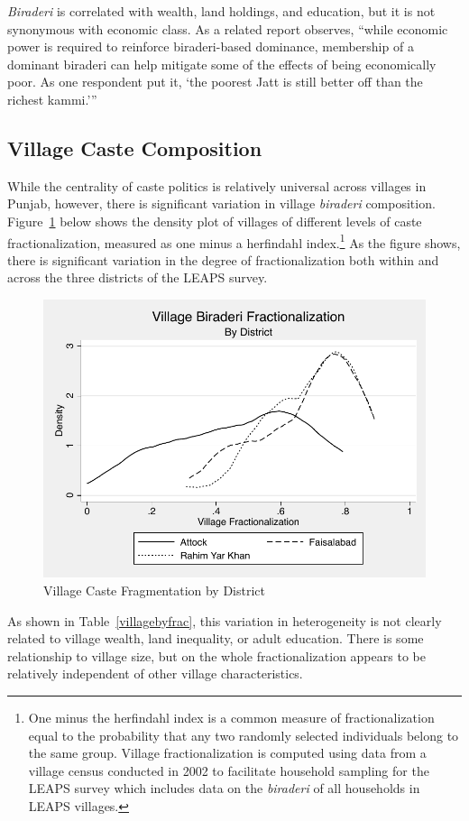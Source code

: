 \documentclass[Eubank_pk_ethnic_sorting.tex]{subfiles}
\begin{document}
\emph{Biraderi} is correlated with wealth, land holdings, and education, but it is not synonymous with economic class. As a related report observes, ``while economic power is required to reinforce biraderi-based dominance, membership of a dominant biraderi can help mitigate some of the effects of being economically poor. As one respondent put it, `the poorest Jatt is still better off than the richest kammi.''' \citep[p. 13]{Gazdar:2007vt}

\subsection{Village Caste Composition}\label{context_village_composition}

While the centrality of caste politics is relatively universal across villages in Punjab, however, there is significant variation in village \emph{biraderi} composition. Figure~\ref{fracdensities} below shows the density plot of villages of different levels of caste fractionalization, measured as one minus a herfindahl index.\footnote{One minus the herfindahl index is a common measure of fractionalization equal to the probability that any two randomly selected individuals belong to the same group. Village fractionalization is computed using data from a village census conducted in 2002 to facilitate household sampling for the LEAPS survey which includes data on the \emph{biraderi} of all households in LEAPS villages.} As the figure shows, there is significant variation in the degree of fractionalization both within and across the three districts of the LEAPS survey.

\begin{figure}[htb]
	\begin{center}
	\caption{Village Caste Fragmentation by District}\label{fracdensities}
	\includegraphics[scale=1.0]{../results/village_frac_by_district.pdf}
	\end{center}
\end{figure}

As shown in Table~\ref{villagebyfrac}, this variation in heterogeneity is not clearly related to village wealth, land inequality, or adult education. There is some relationship to village size, but on the whole fractionalization appears to be relatively independent of other village characteristics.


\end{document}

